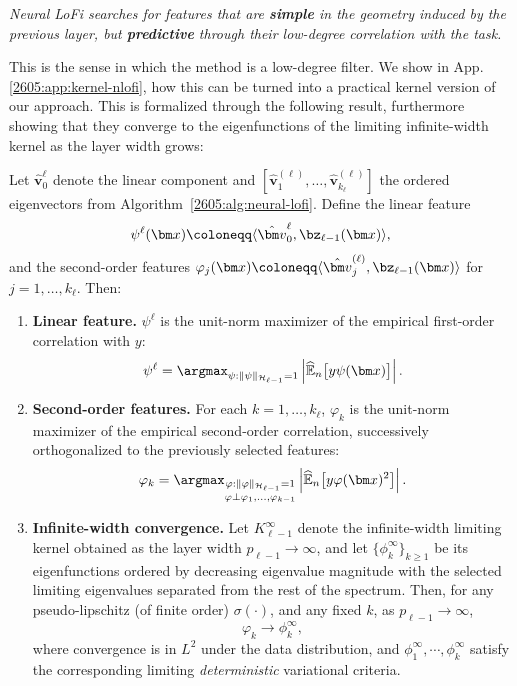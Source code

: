 \emph{
Neural LoFi searches for features that are {\bf simple} in the geometry induced by the previous layer, but {\bf predictive} through their low-degree correlation with the task.}

This is the sense in which the method is a low-degree filter.  We show in App.\ref{2605:app:kernel-nlofi}, how this can  be turned into a practical kernel version of our approach. This is formalized through the following result, furthermore showing that they converge to the eigenfunctions of the limiting infinite-width kernel as the layer width grows:
\begin{theorem}
\label{2605:thm:variational-rkhs}
Let $\hat{\bm v}^\ell_0$ denote the linear component and $[\hat{\bm v}^{(\ell)}_1,\dots,\hat{\bm v}^{(\ell)}_{k_\ell}]$ the ordered eigenvectors from Algorithm~\ref{2605:alg:neural-lofi}. 
Define the linear feature
\[
    \psi^\ell(\bm x) \coloneqq \langle \hat{\bm v}^\ell_0,  \bz_{\ell-1}(\bm x)\rangle,
\]
and the second-order features $\varphi_j(\bm x) \coloneqq \langle \hat{\bm v}^{(\ell)}_j,\bz_{\ell-1}(\bm x)\rangle$ for $j=1,\dots,k_\ell$. Then:
\begin{enumerate}
    \item \textbf{Linear feature.} $\psi^\ell$ is the unit-norm maximizer of the empirical first-order correlation with $y$:
    \begin{equation}
        \psi^\ell  =  \argmax_{\psi: \|\psi\|_{\mathcal H_{\ell-1}}=1}
        \left| \widehat{\mathbb E}_n\bigl[y \psi(\bm x)\bigr] \right|.
        \label{2605:eq:prop-linear-var}
    \end{equation}
    \item \textbf{Second-order features.} For each $k=1,\dots,k_\ell$, $\varphi_k$ is the unit-norm maximizer of the empirical second-order correlation, successively orthogonalized to the previously selected features:
    \begin{equation}
        \varphi_k  =  \argmax_{\substack{\varphi: \|\varphi\|_{\mathcal H_{\ell-1}}=1\\ \varphi\perp\varphi_1,\dots,\varphi_{k-1}}}
        \left| \widehat{\mathbb E}_n\bigl[y \varphi(\bm x)^2\bigr] \right|.
        \label{2605:eq:prop-quadratic-var}
    \end{equation}
    \item \textbf{Infinite-width convergence.} Let $K^{\infty}_{\ell-1}$ denote the infinite-width limiting kernel obtained as the layer width $p_{\ell-1}\to\infty$, and let $\{\phi^{\infty}_k\}_{k\geq 1}$ be its eigenfunctions ordered by decreasing eigenvalue magnitude with the selected limiting eigenvalues separated from the rest of the spectrum. Then, for any  pseudo-lipschitz (of finite order) $\sigma(\cdot)$, and any fixed $k$, as $p_{\ell-1}\to\infty$,
    \[
        \varphi_k  \xrightarrow{   }  \phi^{\infty}_k,
    \]
    where convergence is in $L^2$ under the data distribution, and $\phi^{\infty}_1,\cdots, \phi^{\infty}_k$ satisfy the corresponding limiting {\it deterministic} variational criteria.
\end{enumerate}
\end{theorem}

